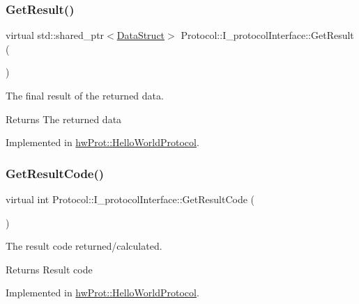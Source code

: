 \subsubsection{\texorpdfstring{GetResult()}{GetResult()}}
{\footnotesize\ttfamily virtual std\+::shared\+\_\+ptr$<$\mbox{\hyperlink{structProtocol_1_1DataStruct}{Data\+Struct}}$>$ Protocol\+::\+I\+\_\+protocol\+Interface\+::\+Get\+Result (\begin{DoxyParamCaption}{ }\end{DoxyParamCaption})\hspace{0.3cm}{\ttfamily [pure virtual]}}



The final result of the returned data. 

\begin{DoxyReturn}{Returns}
The returned data 
\end{DoxyReturn}


Implemented in \mbox{\hyperlink{classhwProt_1_1HelloWorldProtocol_a501dc84119c67434a430245efd4d7439}{hw\+Prot\+::\+Hello\+World\+Protocol}}.

\mbox{\label{classProtocol_1_1I__protocolInterface_a3406495239b3685f089b62a3a34612bc}} 
\subsubsection{\texorpdfstring{GetResultCode()}{GetResultCode()}}
{\footnotesize\ttfamily virtual int Protocol\+::\+I\+\_\+protocol\+Interface\+::\+Get\+Result\+Code (\begin{DoxyParamCaption}{ }\end{DoxyParamCaption})\hspace{0.3cm}{\ttfamily [pure virtual]}}



The result code returned/calculated. 

\begin{DoxyReturn}{Returns}
Result code 
\end{DoxyReturn}


Implemented in \mbox{\hyperlink{classhwProt_1_1HelloWorldProtocol_a90d21e61e3444d0e2265d3b11dcbc74c}{hw\+Prot\+::\+Hello\+World\+Protocol}}.

\mbox{\label{classProtocol_1_1I__protocolInterface_a9c44ced4f589b5e694da148128fff938}} 
